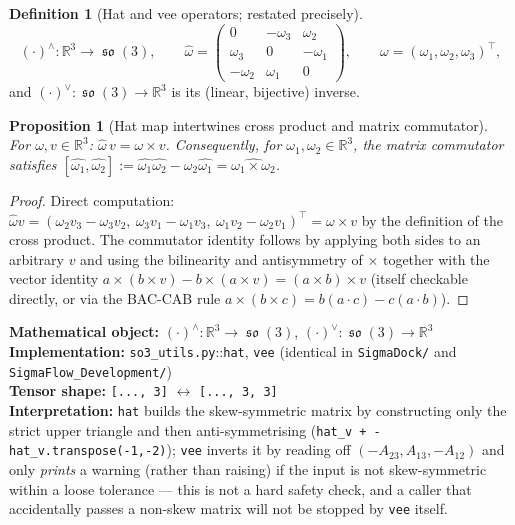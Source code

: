 \documentclass[11pt,a4paper]{report}
\newtheorem{proposition}[proposition]{Proposition}
\theoremstyle{definition}
\newtheorem{definition}[definition]{Definition}
\theoremstyle{remark}
\DeclareMathOperator{\so}{\mathfrak{so}}
\newcommand{\RR}{\mathbb R}
\newcommand{\file}[1]{\texttt{#1}}
\newcommand{\pyfunc}[1]{\texttt{#1}}
\newcommand{\shape}[1]{\texttt{[#1]}}
\begin{document}
\begin{definition}[Hat and vee operators; restated precisely]
\label{def:hatvee-scratch}
\[
(\cdot)^{\wedge}:\RR^3\to\so(3),
\qquad
\widehat\omega
=
\begin{pmatrix}
0&-\omega_3&\omega_2\\
\omega_3&0&-\omega_1\\
-\omega_2&\omega_1&0
\end{pmatrix},
\qquad
\omega=(\omega_1,\omega_2,\omega_3)^\top,
\]
and $(\cdot)^{\vee}:\so(3)\to\RR^3$ is its (linear, bijective) inverse.
\end{definition}

\begin{proposition}[Hat map intertwines cross product and matrix commutator]
\label{prop:hat-cross}
For $\omega,v\in\RR^3$: $\widehat\omega\, v = \omega\times v$. Consequently,
for $\omega_1,\omega_2\in\RR^3$, the matrix commutator satisfies
$[\widehat{\omega_1},\widehat{\omega_2}] := \widehat{\omega_1}\widehat{\omega_2}-\widehat{\omega_2}\widehat{\omega_1}
= \widehat{\omega_1\times\omega_2}$.
\end{proposition}

\begin{proof}
Direct computation: $\widehat\omega v =
(\omega_2v_3-\omega_3v_2,\ \omega_3v_1-\omega_1v_3,\ \omega_1v_2-\omega_2v_1)^\top
= \omega\times v$ by the definition of the cross product. The
commutator identity follows by applying both sides to an arbitrary $v$ and
using the bilinearity and antisymmetry of $\times$ together with the
vector identity $a\times(b\times v) - b\times(a\times v) = (a\times b)\times v$
(itself checkable directly, or via the BAC-CAB rule
$a\times(b\times c)=b(a\cdot c)-c(a\cdot b)$).
\end{proof}

\begin{codebox}
\textbf{Mathematical object:} $(\cdot)^{\wedge}:\RR^3\to\so(3)$, $(\cdot)^{\vee}:\so(3)\to\RR^3$ \\
\textbf{Implementation:} \file{so3\_utils.py}::\pyfunc{hat}, \pyfunc{vee}
(identical in \file{SigmaDock/} and \file{SigmaFlow\_Development/}) \\
\textbf{Tensor shape:} \shape{..., 3} $\leftrightarrow$ \shape{..., 3, 3} \\
\textbf{Interpretation:} \pyfunc{hat} builds the skew-symmetric matrix by
constructing only the strict upper triangle and then anti-symmetrising
(\texttt{hat\_v + -hat\_v.transpose(-1,-2)}); \pyfunc{vee} inverts it by
reading off $(-A_{23},A_{13},-A_{12})$ and only \emph{prints} a warning
(rather than raising) if the input is not skew-symmetric within a loose
tolerance --- this is not a hard safety check, and a caller that
accidentally passes a non-skew matrix will not be stopped by \pyfunc{vee}
itself.
\end{codebox}
\end{document}
